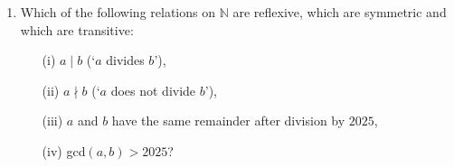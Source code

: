 \documentclass[11pt]{article}
\begin{document}
\begin{enumerate}
\item
Which of the following relations on $\mathbb{N}$ are reflexive, which are symmetric and which are transitive:
\begin{itemize}
\item[(i)] $a \mid b$ (`$a$ divides $b$'),
\item[(ii)] $a \nmid b$ (`$a$ does not divide $b$'),
\item[(iii)] $a$ and $b$ have the same remainder after division by $2025$,
\item[(iv)] gcd$(a, b) > 2025$?
\end{itemize}

\end{enumerate}
\end{document}
